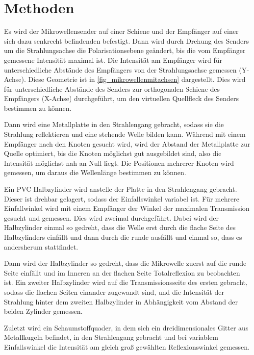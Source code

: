 \documentclass[
	a4paper,
	12pt,
	pagesize,
	ngerman
]{scrartcl}
\begin{document}
	\section{Methoden}
	Es wird der Mikrowellensender auf einer Schiene und der Empfänger auf  einer sich dazu senkrecht befindenden befestigt.
	Dann wird durch Drehung des Senders um die Strahlungsachse die Polarisationsebene geändert, bis die vom Empfänger gemessene Intensität maximal ist.
	Die Intensität am Empfänger wird für unterschiedliche Abstände des Empfängers von der Strahlungsachse gemessen (Y-Achse).
	Diese Geometrie ist in \cref{fig_mikrowellenmitachsen} dargestellt.
	Dies wird für unterschiedliche Abstände des Senders zur orthogonalen Schiene des Empfängers (X-Achse) durchgeführt, um den virtuellen Quellfleck des Senders bestimmen zu können.
	
	Dann wird eine Metallplatte in den Strahlengang gebracht, sodass sie die Strahlung reflektieren und eine stehende Welle bilden kann.
	Während mit einem Empfänger nach den Knoten gesucht wird, wird der Abstand der Metallplatte zur Quelle optimiert, bis die Knoten möglichst gut ausgebildet sind, also die Intensität möglichst nah an Null liegt.
	Die Positionen mehrerer Knoten wird gemessen, um daraus die Wellenlänge bestimmen zu können.
	
	Ein PVC-Halbzylinder wird anstelle der Platte in den Strahlengang gebracht.
	Dieser ist drehbar gelagert, sodass der Einfallswinkel variabel ist.
	Für mehrere Einfallwinkel wird mit einem Empfänger der Winkel der maximalen Transmission gesucht und gemessen.
	Dies wird zweimal durchgeführt.
	Dabei wird der Halbzylinder einmal so gedreht, dass die Welle erst durch die flache Seite des Halbzylinders einfällt und dann durch die runde ausfällt und einmal so, dass es andersherum stattfindet.
	
	Dann wird der Halbzylinder so gedreht, dass die Mikrowelle zuerst auf die runde Seite einfällt und im Inneren an der flachen Seite Totalreflexion zu beobachten ist.
	Ein zweiter Halbzylinder wird auf die Transmissionsseite des ersten gebracht, sodass die flachen Seiten einander zugewandt sind, und die Intensität der Strahlung hinter dem zweiten Halbzylinder in Abhängigkeit vom Abstand der beiden Zylinder gemessen.
	
	Zuletzt wird ein Schaumstoffquader, in dem sich ein dreidimensionales Gitter aus Metallkugeln befindet, in den Strahlengang gebracht und bei variablem Einfallswinkel die Intensität am gleich groß gewählten Reflexionswinkel gemessen.
	
\end{document}
